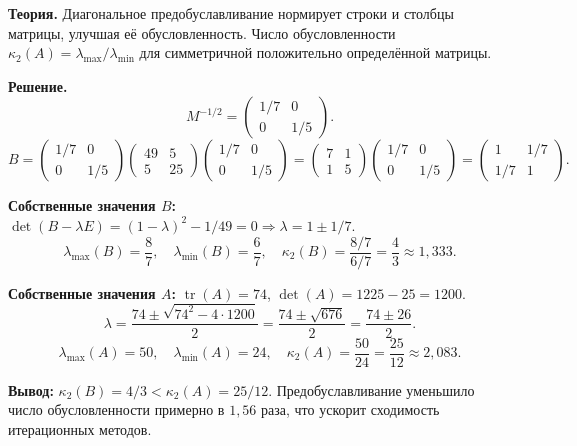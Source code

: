\documentclass{article}
\begin{document}
\textbf{Теория.} Диагональное предобуславливание нормирует строки и столбцы матрицы, улучшая её обусловленность. Число обусловленности $\kappa_2(A) = \lambda_{\max}/\lambda_{\min}$ для симметричной положительно определённой матрицы.

\textbf{Решение.}
$$M^{-1/2} = \begin{pmatrix} 1/7 & 0 \\ 0 & 1/5 \end{pmatrix}.$$
$$B = \begin{pmatrix} 1/7 & 0 \\ 0 & 1/5 \end{pmatrix}\begin{pmatrix} 49 & 5 \\ 5 & 25 \end{pmatrix}\begin{pmatrix} 1/7 & 0 \\ 0 & 1/5 \end{pmatrix} = \begin{pmatrix} 7 & 1 \\ 1 & 5 \end{pmatrix}\begin{pmatrix} 1/7 & 0 \\ 0 & 1/5 \end{pmatrix} = \begin{pmatrix} 1 & 1/7 \\ 1/7 & 1 \end{pmatrix}.$$

\textbf{Собственные значения $B$:} $\det(B - \lambda E) = (1-\lambda)^2 - 1/49 = 0 \Rightarrow \lambda = 1 \pm 1/7$.
$$\lambda_{\max}(B) = \frac{8}{7}, \quad \lambda_{\min}(B) = \frac{6}{7}, \quad \kappa_2(B) = \frac{8/7}{6/7} = \frac{4}{3} \approx 1,333.$$

\textbf{Собственные значения $A$:} $\operatorname{tr}(A) = 74$, $\det(A) = 1225 - 25 = 1200$.
$$\lambda = \frac{74 \pm \sqrt{74^2 - 4\cdot 1200}}{2} = \frac{74 \pm \sqrt{676}}{2} = \frac{74 \pm 26}{2}.$$
$$\lambda_{\max}(A) = 50, \quad \lambda_{\min}(A) = 24, \quad \kappa_2(A) = \frac{50}{24} = \frac{25}{12} \approx 2,083.$$

\textbf{Вывод:} $\kappa_2(B) = 4/3 < \kappa_2(A) = 25/12$. Предобуславливание уменьшило число обусловленности примерно в $1,56$ раза, что ускорит сходимость итерационных методов.


\end{document}
